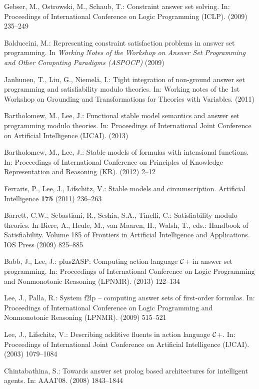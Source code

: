 \documentclass[runningheads]{llncs}
\begin{document}
\begin{thebibliography}{10}

Gebser, M., Ostrowski, M., Schaub, T.:
\newblock Constraint answer set solving.
\newblock In: Proceedings of International Conference on Logic Programming
  (ICLP). (2009)  235--249

Balduccini, M.:
\newblock Representing constraint satisfaction problems in answer set
  programming.
\newblock In {\em Working Notes of the Workshop on Answer Set Programming and
  Other Computing Paradigms (ASPOCP)} (2009)

Janhunen, T., Liu, G., Niemel{\"a}, I.:
\newblock Tight integration of non-ground answer set programming and
  satisfiability modulo theories.
\newblock In: Working notes of the 1st Workshop on Grounding and
  Transformations for Theories with Variables. (2011)

Bartholomew, M., Lee, J.:
\newblock Functional stable model semantics and answer set programming modulo
  theories.
\newblock In: Proceedings of International Joint Conference on Artificial
  Intelligence (IJCAI). (2013)

Bartholomew, M., Lee, J.:
\newblock Stable models of formulas with intensional functions.
\newblock In: Proceedings of International Conference on Principles of
  Knowledge Representation and Reasoning (KR). (2012)  2--12

Ferraris, P., Lee, J., Lifschitz, V.:
\newblock Stable models and circumscription.
\newblock Artificial Intelligence \textbf{175} (2011)  236--263

Barrett, C.W., Sebastiani, R., Seshia, S.A., Tinelli, C.:
\newblock Satisfiability modulo theories.
\newblock In Biere, A., Heule, M., van Maaren, H., Walsh, T., eds.: Handbook of
  Satisfiability. Volume 185 of Frontiers in Artificial Intelligence and
  Applications.
\newblock IOS Press (2009)  825--885

Babb, J., Lee, J.:
plus2{A}{S}{P}: Computing action language {$\cal C$+} in answer
  set programming.
\newblock In: Proceedings of International Conference on Logic Programming and
  Nonmonotonic Reasoning (LPNMR). (2013)  122--134

Lee, J., Palla, R.:
\newblock System {\sc f2lp} -- computing answer sets of first-order formulas.
\newblock In: Proceedings of International Conference on Logic Programming and
  Nonmonotonic Reasoning (LPNMR). (2009)  515--521

Lee, J., Lifschitz, V.:
\newblock Describing additive fluents in action language {$\cal C$+}.
\newblock In: Proceedings of International Joint Conference on Artificial
  Intelligence ({IJCAI}). (2003)  1079--1084

Chintabathina, S.:
\newblock Towards answer set prolog based architectures for intelligent agents.
\newblock In: AAAI'08. (2008)  1843--1844

\end{thebibliography}





%
\end{document}
